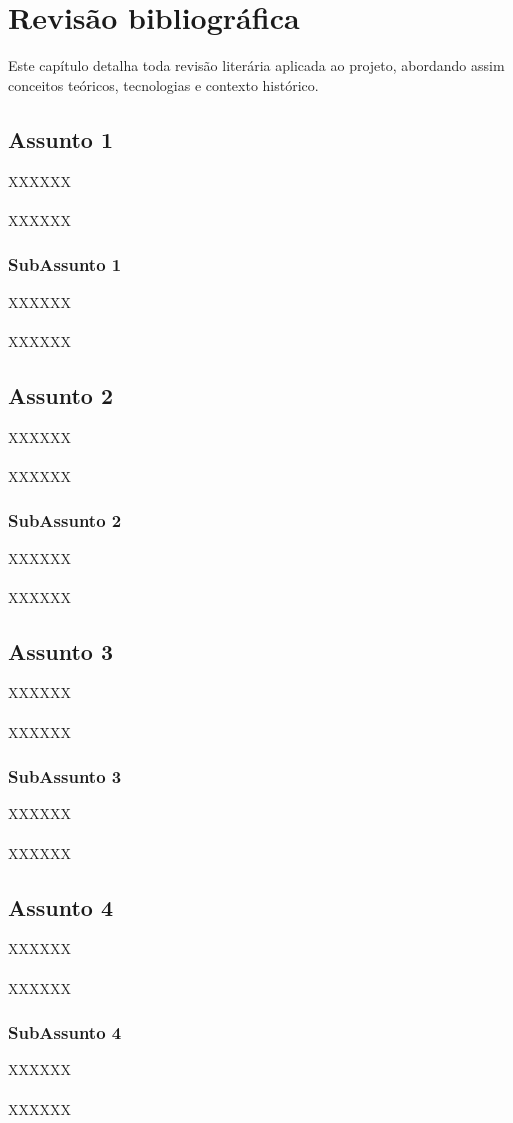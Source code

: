\chapter{Revisão bibliográfica}
\label{Cap:RevisaoBibliografica}
\newcommand{\WidthAlgumaCoisa}{6.5 cm}

Este capítulo detalha toda revisão literária aplicada ao projeto,  abordando assim conceitos teóricos, tecnologias e contexto histórico.

\section{Assunto 1}

XXXXXX
\\\\
XXXXXX

\subsection{SubAssunto 1}

XXXXXX
\\\\
XXXXXX

\section{Assunto 2}

XXXXXX
\\\\
XXXXXX

\subsection{SubAssunto 2}

XXXXXX
\\\\
XXXXXX

\section{Assunto 3}

XXXXXX
\\\\
XXXXXX

\subsection{SubAssunto 3}

XXXXXX
\\\\
XXXXXX

\section{Assunto 4}

XXXXXX
\\\\
XXXXXX

\subsection{SubAssunto 4}

XXXXXX
\\\\
XXXXXX


